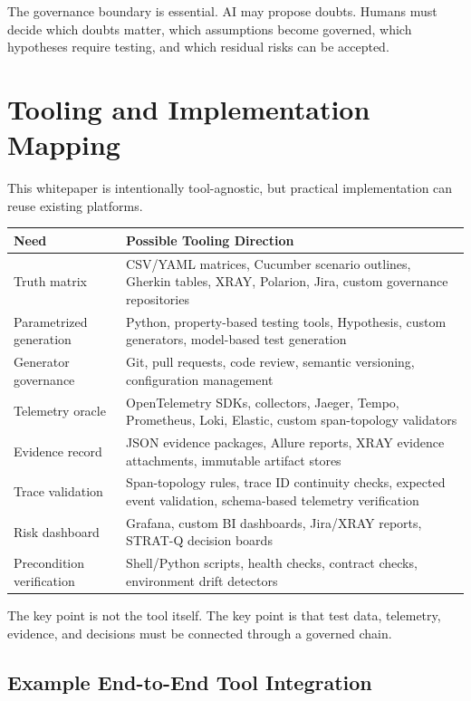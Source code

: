 \documentclass[11pt,a4paper]{article}
\begin{document}
The governance boundary is essential. AI may propose doubts. Humans must decide which doubts matter, which assumptions become governed, which hypotheses require testing, and which residual risks can be accepted.

\section{Tooling and Implementation Mapping}

This whitepaper is intentionally tool-agnostic, but practical implementation can reuse existing platforms.

\begin{longtable}{p{4cm}p{9.5cm}}
\toprule
\textbf{Need} & \textbf{Possible Tooling Direction} \\
\midrule
Truth matrix & CSV/YAML matrices, Cucumber scenario outlines, Gherkin tables, XRAY, Polarion, Jira, custom governance repositories \\
Parametrized generation & Python, property-based testing tools, Hypothesis, custom generators, model-based test generation \\
Generator governance & Git, pull requests, code review, semantic versioning, configuration management \\
Telemetry oracle & OpenTelemetry SDKs, collectors, Jaeger, Tempo, Prometheus, Loki, Elastic, custom span-topology validators \\
Evidence record & JSON evidence packages, Allure reports, XRAY evidence attachments, immutable artifact stores \\
Trace validation & Span-topology rules, trace ID continuity checks, expected event validation, schema-based telemetry verification \\
Risk dashboard & Grafana, custom BI dashboards, Jira/XRAY reports, STRAT-Q decision boards \\
Precondition verification & Shell/Python scripts, health checks, contract checks, environment drift detectors \\
\bottomrule
\end{longtable}

The key point is not the tool itself. The key point is that test data, telemetry, evidence, and decisions must be connected through a governed chain.

\subsection{Example End-to-End Tool Integration}
\end{document}

